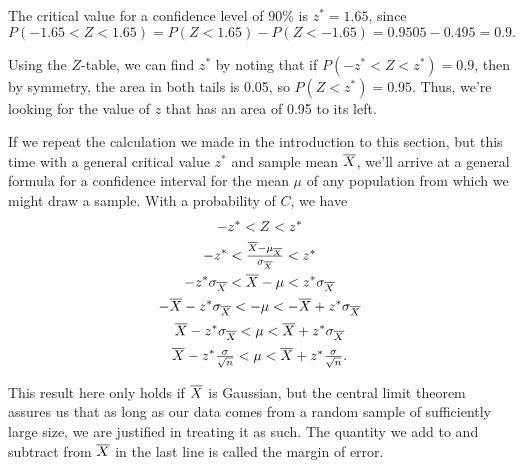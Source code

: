 \begin{example}
The critical value for a confidence level of $90\%$ is $z^* = 1.65$, since 
$$P(-1.65 < Z < 1.65) = P(Z < 1.65) - P(Z < -1.65) = 0.9505 - 0.495 = 0.9.$$
\begin{center}
\end{center}
Using the $Z$-table, we can find $z^*$ by noting that if $P(-z^* < Z < z^*) = 0.9$, then by symmetry, the area in both tails is 0.05, so $P(Z < z^*) = 0.95$. Thus, we're looking for the value of $z$ that has an area of 0.95 to its left.
\end{example}

If we repeat the calculation we made in the introduction to this section, but this time with a general critical value $z^*$ and sample mean ${\overline{X}}$, we'll arrive at a general formula for a confidence interval for the mean $\mu$ of any population from which we might draw a sample. With a probability of $C$, we have
\begin{gather*}
-z^* < Z < z^* \\
-z^* < \textstyle\frac{\overline{X}- \mu_{\overline{X}}}{\sigma_{\overline{X}}} < z^* \\
-z^* \sigma_{\overline{X}} < \overline{X}- \mu < z^* \sigma_{\overline{X}} \\[0.2ex]
-\overline{X}-z^* \sigma_{\overline{X}} < - \mu < -\overline{X}+z^* \sigma_{\overline{X}} \\[0.3ex]
\overline{X}-z^* \sigma_{\overline{X}} <  \mu < \overline{X}+z^* \sigma_{\overline{X}} \\[0.3ex]
\overline{X}-z^* \textstyle\frac{\sigma}{\sqrt{n}} <  \mu < \overline{X}+z^* 
\frac{\sigma}{\sqrt{n}}.
\end{gather*}

This result here only holds if ${\overline{X}}$ is Gaussian, but the central limit theorem assures us that as long as our data comes from a random sample of sufficiently large size, we are justified in treating it as such. The quantity we add to and subtract from ${\overline{X}}$ in the last line is called the margin of error.

